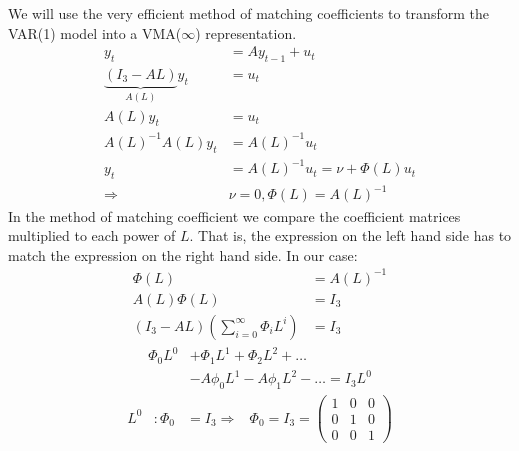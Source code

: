\documentclass[a4paper]{scrartcl}
\begin{document}
\begin{enumerate}
              \begin{solution}
                  We will use the very efficient method of matching coefficients to transform the VAR(1) model into a VMA($\infty$) representation.
                  \begin{align*}
                      y_t                                 & = A y_{t-1} + u_t                   \\
                      \underbrace{(I_3 - A L)}_{A(L)} y_t & = u_t                               \\
                      A(L) y_t                            & = u_t                               \\
                      A(L)^{-1}A(L) y_t                   & = A(L)^{-1} u_t                     \\
                      y_t                                 & = A(L)^{-1} u_t = \nu + \Phi(L) u_t \\
                      \Rightarrow                         & \nu= 0, \Phi(L) = A(L)^{-1}
                  \end{align*}
                  In the method of matching coefficient we compare the coefficient matrices multiplied to each power of $L$. That is, the expression on the left hand side has to match the expression on the right hand side. In our case:
                  \begin{align*}
                      \Phi(L)                                               & = A(L)^{-1} \\
                      A(L) \Phi(L)                                          & = I_3       \\
                      (I_3 - A L) \left(\sum_{i=0}^\infty \Phi_i L^i\right) & = I_3
                  \end{align*}
                  \begin{align*}
                      \Phi_0 L^0 & + \Phi_1 L^1 + \Phi_2 L^2 + \dots               \\
                                 & - A \phi_0 L^1 - A \phi_1 L^2 - \dots = I_3 L^0
                  \end{align*}
                  \begin{align}
                      L^0 & : \Phi_0                                     & = I_3 \Rightarrow & \Phi_0 = I_3 = \begin{pmatrix}1&0&0\\0&1&0\\0&0&1 \end{pmatrix}\nonumber                                 \\

\end{align}
\end{solution}
\end{enumerate}
\end{document}

